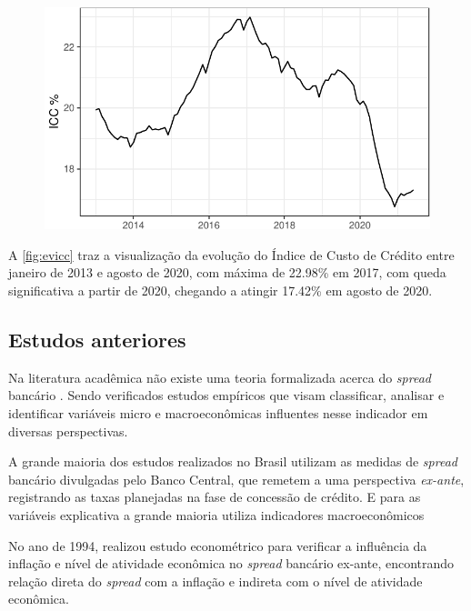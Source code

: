 \documentclass[12pt,openright,oneside,a4paper,chapter=TITLE,section=TITLE,subsection=TITLE,english,french,spanish,portugues,sumario=tradicional]{04-class-files/abntex2}
\begin{document}
\begin{figure}

\begin{center}\includegraphics{12-exportedfigures/ICC-1} \end{center}
\label{fig:evicc}
\end{figure}

A \autoref{fig:evicc} traz a visualização da evolução do Índice de Custo de
Crédito entre janeiro de 2013 e agosto de 2020, com máxima de 22.98\% em
2017, com queda significativa a partir de 2020, chegando a atingir 17.42\%
em agosto de 2020.

\subsection{Estudos anteriores}

Na literatura acadêmica não existe uma teoria formalizada acerca do \emph{spread}
bancário \cite{timotio:2018}. Sendo verificados estudos empíricos que visam
classificar, analisar e identificar variáveis micro e macroeconômicas
influentes nesse indicador em diversas perspectivas.

A grande maioria dos estudos realizados no Brasil utilizam as medidas de
\emph{spread} bancário divulgadas pelo Banco Central, que remetem a uma perspectiva
\emph{ex-ante}, registrando as taxas planejadas na fase de concessão de crédito. E
para as variáveis explicativa a grande maioria utiliza indicadores
macroeconômicos \cite{dantas:2012}

No ano de 1994, \textcite{aronovich:1994} realizou estudo econométrico para
verificar a influência da inflação e nível de atividade econômica no \emph{spread}
bancário ex-ante, encontrando relação direta do \emph{spread} com a inflação e
indireta com o nível de atividade econômica.
\end{document}
